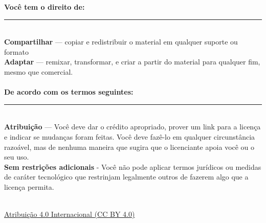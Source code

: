\vfill
\small{\noindent \textbf{Você tem o direito de:}} \vspace{-3mm}\\
\noindent \rule{3.3cm}{0.5pt} \\
\textbf{Compartilhar } — copiar e redistribuir o material em qualquer suporte ou formato \\
\textbf{Adaptar} — remixar, transformar, e criar a partir do material para qualquer fim, mesmo que comercial. \\
\\
\small{\noindent \textbf{De acordo com os termos seguintes:}}\vspace{-3mm}\\
\noindent \rule{3.3cm}{0.5pt} \\
\textbf{Atribuição} — Você deve dar o crédito apropriado, prover um link para a licença e indicar se mudanças foram feitas. Você deve fazê-lo em qualquer circunstância razoável, mas de nenhuma maneira que sugira que o licenciante apoia você ou o seu uso.  \\
\textbf{Sem restrições adicionais} - Você não pode aplicar termos jurídicos ou medidas de caráter tecnológico que restrinjam legalmente outros de fazerem algo que a licença permita.  \\
\vspace{10mm} \\
\centerline{\href{https://creativecommons.org/licenses/by/4.0/deed.pt-br}{Atribuição 4.0 Internacional (CC BY 4.0)}}
\vspace{5mm}\\
\centerline{\ccby}
